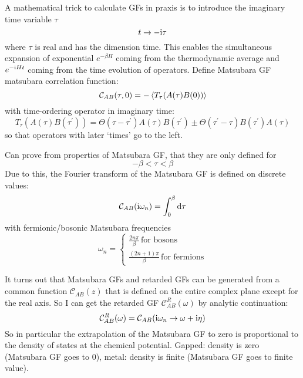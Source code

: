 \documentclass[../notes.tex]{subfiles}
\begin{document}

A mathematical trick to calculate GFs in praxis is to introduce the imaginary time variable \(\tau\)
\begin{equation}
	t \to -\mathrm{i} \tau
\end{equation}
where \(\tau\) is real and has the dimension time.
This enables the simultaneous expansion of exponential \(e^{-\beta H}\) coming from the thermodynamic average and \(e^{-\mathrm{i} H t}\) coming from the time evolution of operators.
Define Matsubara GF \gls{matsubara correlation function}:
\begin{equation}
	\mathcal{C}_{A B} (\tau, 0) = - \Braket{T_{\tau} (A(\tau) B(0))}
\end{equation}
with time-ordering operator in imaginary time:
\begin{equation}
	T_{\tau} (A(\tau) B(\tau^{\prime})) = \Theta(\tau - \tau^{\prime}) A(\tau) B(\tau^{\prime}) \pm \Theta(\tau^{\prime} - \tau) B(\tau^{\prime}) A(\tau)
\end{equation}
so that operators with later `times' go to the left.

Can prove from properties of Matsubara GF, that they are only defined for
\begin{equation}
	-\beta < \tau < \beta
\end{equation}
Due to this, the Fourier transform of the Matsubara GF is defined on discrete values:
\begin{equation}
	\mathcal{C}_{A B} (\iu \omega_n) = \int_{0}^{\beta} \odif{\tau}
\end{equation}
with fermionic/bosonic Matsubara frequencies
\begin{equation}
	\omega_n =
	\begin{cases}
		\frac{2n \pi}{\beta} \, \text{for bosons} \\
		\frac{(2n + 1)\pi}{\beta} \, \text{for fermions}
	\end{cases}
\end{equation}

It turns out that Matsubara GFs and retarded GFs can be generated from a common function \(\mathcal{C}_{AB} (z)\) that is defined on the entire complex plane except for the real axis.
So I can get the retarded GF \(\mathcal{C}_{AB}^R (\omega)\) by analytic continuation:
\begin{equation}
	\mathcal{C}_{AB}^R (\omega) = \mathcal{C}_{AB} (\mathrm{i} \omega_n \to \omega + \mathrm{i} \eta)
\end{equation}
So in particular the extrapolation of the Matsubara GF to zero is proportional to the density of states at the chemical potential.
Gapped: density is zero (Matsubara GF goes to 0), metal: density is finite (Matsubara GF goes to finite value).
\end{document}
